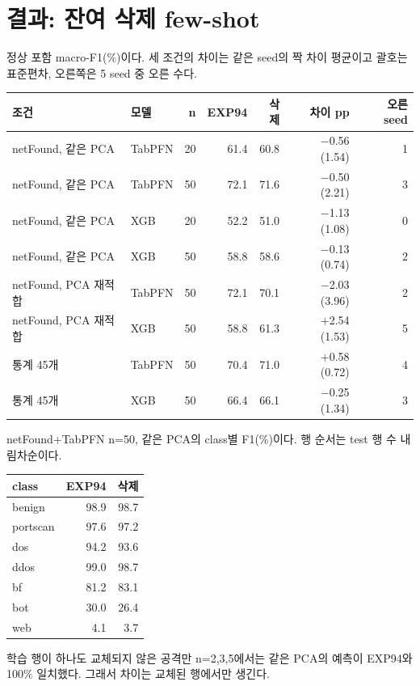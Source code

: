 \section{결과: 잔여 삭제 few-shot}
정상 포함 macro-F1(\%)이다. 세 조건의 차이는 같은 seed의 짝 차이 평균이고 괄호는 표준편차, 오른쪽은 5 seed 중 오른 수다.
\begin{center}\small
\begin{tabular}{llrrrrr}
\toprule
조건 & 모델 & n & EXP94 & 삭제 & 차이 pp & 오른 seed\\\midrule
netFound, 같은 PCA & TabPFN & 20 & 61.4 & 60.8 & $-$0.56 (1.54) & 1\\
netFound, 같은 PCA & TabPFN & 50 & 72.1 & 71.6 & $-$0.50 (2.21) & 3\\
netFound, 같은 PCA & XGB & 20 & 52.2 & 51.0 & $-$1.13 (1.08) & 0\\
netFound, 같은 PCA & XGB & 50 & 58.8 & 58.6 & $-$0.13 (0.74) & 2\\
netFound, PCA 재적합 & TabPFN & 50 & 72.1 & 70.1 & $-$2.03 (3.96) & 2\\
netFound, PCA 재적합 & XGB & 50 & 58.8 & 61.3 & +2.54 (1.53) & 5\\
통계 45개 & TabPFN & 50 & 70.4 & 71.0 & +0.58 (0.72) & 4\\
통계 45개 & XGB & 50 & 66.4 & 66.1 & $-$0.25 (1.34) & 3\\
\bottomrule
\end{tabular}
\end{center}

netFound+TabPFN n=50, 같은 PCA의 class별 F1(\%)이다. 행 순서는 test 행 수 내림차순이다.
\begin{center}\small
\begin{tabular}{lrr}
\toprule
class & EXP94 & 삭제\\\midrule
benign & 98.9 & 98.7\\
portscan & 97.6 & 97.2\\
dos & 94.2 & 93.6\\
ddos & 99.0 & 98.7\\
bf & 81.2 & 83.1\\
bot & 30.0 & 26.4\\
web & 4.1 & 3.7\\
\bottomrule
\end{tabular}
\end{center}
학습 행이 하나도 교체되지 않은 공격만 n=2,3,5에서는 같은 PCA의 예측이 EXP94와 100\% 일치했다. 그래서 차이는 교체된 행에서만 생긴다.

